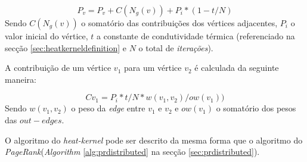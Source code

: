 \documentclass[a4paper,10pt]{report}
\begin{document}
  \begin{center}
    \begin{equation}
      \label{eq:heatkerneldistributedrank}
       P_v = P_v + C(N_g(v)) + P_i * (1 - t/N)
    \end{equation}
    Sendo $C(N_g(v))$ o somatório das contribuições dos vértices adjacentes, $P_i$  o valor inicial do vértice, $t$ a constante de condutividade térmica (referenciado na secção \ref{sec:heatkerneldefinition} e $N$ o total de \textit{iterações}).
  \end{center}    
  
  A contribuição de um vértice $v_1$ para um vértice $v_2$ é calculada da seguinte maneira:
  
  \begin{center}
    \begin{equation}
      \label{eq:heatkerneldistributedcontribution}
       Cv_1=P_i * t / N * w(v_1,v_2)/ow(v_1))
    \end{equation}
    Sendo $w(v_1,v_2)$ o peso da \textit{edge} entre $v_1$ e $v_2$ e $ow(v_1)$ o somatório dos pesos das $out-edges$.
  \end{center}  
  
  O algoritmo do \textit{heat-kernel} pode ser descrito da mesma forma que o algoritmo do \textit{PageRank}(\textit{Algorithm} \ref{alg:prdistributed} na secção \ref{sec:prdistributed}).
  
\end{document}
